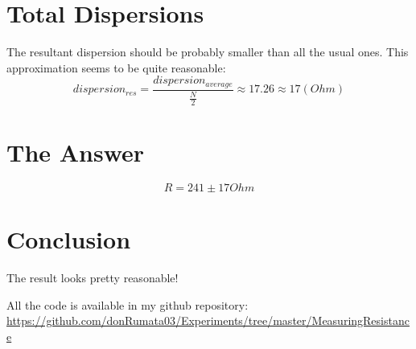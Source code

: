 \documentclass[11pt]{memoir}
\begin{document}
    \newpage
    \section{Total Dispersions}\label{sec:total-dispersions}
    The resultant dispersion should be probably smaller than all the usual ones.
    This approximation seems to be quite reasonable:
    \begin{equation*}
        dispersion_{res} = \frac{dispersion_{average}}{\frac{N}{2}} \approx 17.26 \approx 17 (Ohm)
    \end{equation*}



    \section{The Answer}\label{sec:answer}

    \begin{equation*}
        R = 241 \pm 17 Ohm
    \end{equation*}


    \section{Conclusion}\label{sec:conclusion}

    The result looks pretty reasonable!

    All the code is available in my github repository:
    \url{https://github.com/donRumata03/Experiments/tree/master/MeasuringResistance}


\end{document}
